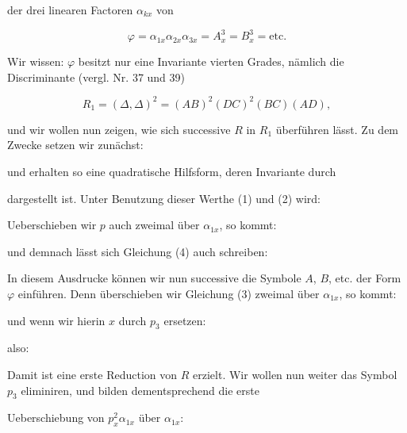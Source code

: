 der drei linearen Factoren $\alpha_{kx}$ von

\[
\varphi=\alpha_{1x}\alpha_{2x}\alpha_{3x}=A_x^3=B_x^3=\text{etc.}
\]

Wir wissen: $\varphi$ besitzt nur eine Invariante vierten Grades, nämlich die Discriminante (vergl. Nr. 37 und 39)

\[
R_1=(\Delta,\Delta)^2=(AB)^2(DC)^2(BC)(AD),
\]

und wir wollen nun zeigen, wie sich successive $R$ in $R_1$ überführen lässt. Zu dem Zwecke setzen wir zunächst:


und erhalten so eine quadratische Hilfsform, deren Invariante durch


dargestellt ist. Unter Benutzung dieser Werthe (1) und (2) wird:



Ueberschieben wir $p$ auch zweimal über $\alpha_{1x}$, so kommt:


und demnach lässt sich Gleichung (4) auch schreiben:


In diesem Ausdrucke können wir nun successive die Symbole $A$, $B$, etc. der Form $\varphi$ einführen. Denn überschieben wir Gleichung (3) zweimal über $\alpha_{1x}$, so kommt:


und wenn wir hierin $x$ durch $p_3$ ersetzen:


also:


Damit ist eine erste Reduction von $R$ erzielt. Wir wollen nun weiter das Symbol $p_3$ eliminiren, und bilden dementsprechend die erste


Ueberschiebung von $p_x^2\alpha_{1x}$ über $\alpha_{1x}$:

